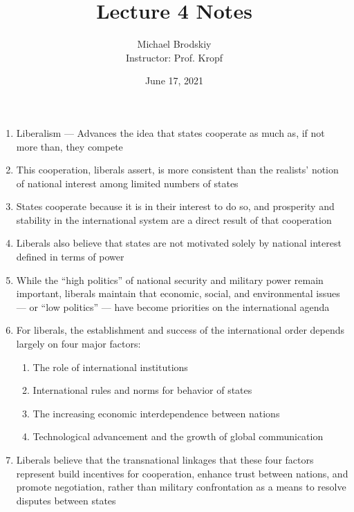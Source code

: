 \documentclass[12pt]{article}
\title{Lecture 4 Notes}
\date{June 17, 2021}
\author{Michael Brodskiy\\ \small Instructor: Prof. Kropf}
\begin{document}
    \maketitle

    \begin{enumerate}

      \item Liberalism — Advances the idea that states cooperate as much as, if not more than, they compete

      \item This cooperation, liberals assert, is more consistent than the realists' notion of national interest among limited numbers of states

      \item States cooperate because it is in their interest to do so, and prosperity and stability in the international system are a direct result of that cooperation

      \item Liberals also believe that states are not motivated solely by national interest defined in terms of power

      \item While the “high politics” of national security and military power remain important, liberals maintain that economic, social, and environmental issues — or “low politics” — have become priorities on the international agenda

      \item For liberals, the establishment and success of the international order depends largely on four major factors:

        \begin{enumerate}

          \item The role of international institutions

          \item International rules and norms for behavior of states

          \item The increasing economic interdependence between nations

          \item Technological advancement and the growth of global communication

        \end{enumerate}

      \item Liberals believe that the transnational linkages that these four factors represent build incentives for cooperation, enhance trust between nations, and promote negotiation, rather than military confrontation as a means to resolve disputes between states


\end{enumerate}
\end{document}
